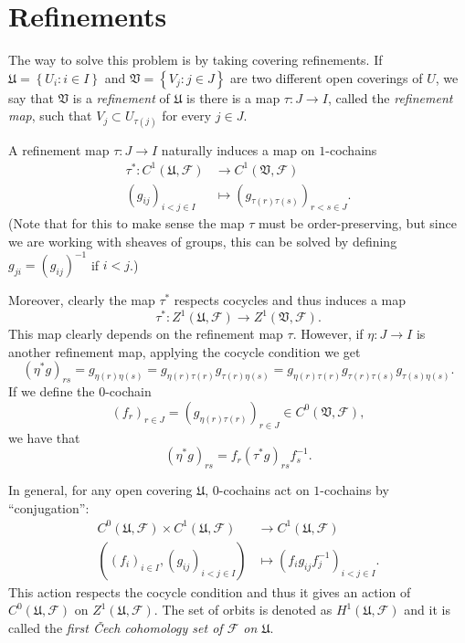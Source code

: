     \section*{Refinements}
    The way to solve this problem is by taking covering refinements. If $\mathfrak{U}=\left\{ U_i: i \in I \right\}$ and $\mathfrak{V}=\left\{ V_j: j \in J \right\}$ are two different open coverings of $U$, we say that $\mathfrak{V}$ is a \emph{refinement} of $\mathfrak{U}$ is there is a map $\tau:J\rightarrow I$, called the \emph{refinement map}, such that $V_j \subset U_{\tau(j)}$ for every $j \in J$. 

    A refinement map $\tau:J \rightarrow I$ naturally induces a map on $1$-cochains
    \begin{align*}
      \tau^* :C^1(\mathfrak{U},\mathcal{F})&\longrightarrow C^1(\mathfrak{V},\mathcal{F})\\ 
      (g_{ij})_{i<j \in I} &\longmapsto (g_{\tau(r)\tau(s)})_{r<s \in J}. 
      \end{align*}
      (Note that for this to make sense the map $\tau$ must be order-preserving, but since we are working with sheaves of groups, this can be solved by defining $g_{ji}=(g_{ij})^{-1}$ if $i<j$.)

      Moreover, clearly the map $\tau^*$ respects cocycles and thus induces a map $$\tau^*:Z^1(\mathfrak{U},\mathcal{F}) \rightarrow Z^1(\mathfrak{V},\mathcal{F}).$$
      This map clearly depends on the refinement map $\tau$. However, if $\eta: J \rightarrow I$ is another refinement map, applying the cocycle condition we get
      \begin{equation*}
	(\eta^*g)_{rs}= g_{\eta(r)\eta(s)}= g_{\eta(r)\tau(r)} g_{\tau(r)\eta(s)} = g_{\eta(r)\tau(r)} g_{\tau(r)\tau(s)} g_{\tau(s) \eta(s)}.
      \end{equation*}
      If we define the $0$-cochain 
      \begin{equation*}
	(f_r)_{r \in J} = (g_{\eta(r)\tau(r)})_{r\in J} \in C^0(\mathfrak{V},\mathcal{F}),
      \end{equation*}
      we have that
      \begin{equation*}
	(\eta^*g)_{rs}=f_r (\tau^*g)_{rs} f_s^{-1}.
      \end{equation*}

      In general, for any open covering $\mathfrak{U}$, $0$-cochains act on $1$-cochains by ``conjugation'':
      \begin{align*}
	C^0(\mathfrak{U},\mathcal{F})\times C^1(\mathfrak{U},\mathcal{F})&\longrightarrow C^1(\mathfrak{U},\mathcal{F})\\ 
	( (f_i)_{i\in I}, (g_{ij})_{i <j \in I} )&\longmapsto (f_i g_{ij} f_j^{-1})_{i <j \in I}. 
	\end{align*}
	This action respects the cocycle condition and thus it gives an action of $C^0(\mathfrak{U},\mathcal{F})$ on $Z^1(\mathfrak{U},\mathcal{F})$. The set of orbits is denoted as $H^1(\mathfrak{U},\mathcal{F})$ and it is called the \emph{first \v{C}ech cohomology set of $\mathcal{F}$ on $\mathfrak{U}$}.
	
